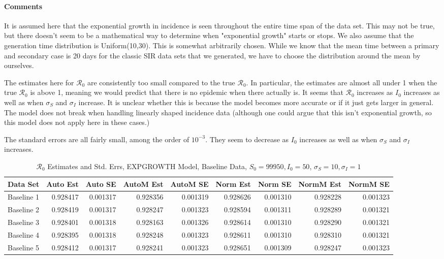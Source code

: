 \documentclass[12pt]{article}
\newcommand{\rr}{\ensuremath{\mathcal{R}_0}}
\begin{document}
\paragraph{Comments}

It is assumed here that the exponential growth in incidence is seen throughout the entire time span of the data set. This may not be true, but there doesn't seem to be a mathematical way to determine when "exponential growth" starts or stops. We also assume that the generation time distribution is Uniform(10,30). This is somewhat arbitrarily chosen. While we know that the mean time between a primary and secondary case is 20 days for the classic SIR data sets that we generated, we have to choose the distribution around the mean by ourselves.

The estimates here for $\rr$ are consistently too small compared to the true $\rr$. In particular, the estimates are almost all under 1 when the true $\rr$ is above 1, meaning we would predict that there is no epidemic when there actually is. It seems that $\rr$ increases as $I_0$ increases as well as when $\sigma_S$ and $\sigma_I$ increase. It is unclear whether this is because the model becomes more accurate or if it just gets larger in general. The model does not break when handling linearly shaped incidence data (although one could argue that this isn't exponential growth, so this model does not apply here in these cases.)

The standard errors are all fairly small, among the order of $10^{-3}$. They seem to decrease as $I_0$ increases as well as when $\sigma_S$ and $\sigma_I$ increases.

\begin{table}[H]
	
	\caption{$\rr$ Estimates and Std. Errs, EXPGROWTH Model, 
		Baseline Data, $S_0 = 99950, I_0 = 50$, 
		$\sigma_S = 10, \sigma_I = 1$}
	\begin{footnotesize}
		\hskip -1cm
	\begin{tabular}{l|r|r|r|r|r|r|r|r}
		\hline
		Data Set & Auto Est & Auto SE & AutoM Est & AutoM SE & Norm Est & Norm SE & NormM Est & NormM SE\\
		\hline
		Baseline 1 & 0.928417 & 0.001317 & 0.928356 & 0.001319 & 0.928626 & 0.001310 & 0.928228 & 0.001323\\
		\hline
		Baseline 2 & 0.928419 & 0.001317 & 0.928247 & 0.001323 & 0.928594 & 0.001311 & 0.928289 & 0.001321\\
		\hline
		Baseline 3 & 0.928401 & 0.001318 & 0.928163 & 0.001326 & 0.928614 & 0.001310 & 0.928290 & 0.001321\\
		\hline
		Baseline 4 & 0.928395 & 0.001318 & 0.928248 & 0.001323 & 0.928611 & 0.001310 & 0.928310 & 0.001321\\
		\hline
		Baseline 5 & 0.928412 & 0.001317 & 0.928241 & 0.001323 & 0.928651 & 0.001309 & 0.928247 & 0.001323\\
		\hline
	\end{tabular}
\end{footnotesize}
\end{table}
\end{document}
